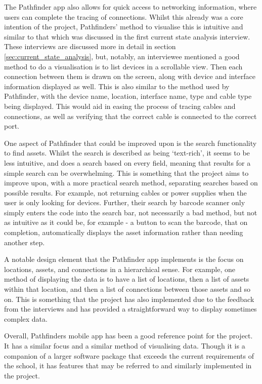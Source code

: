 \documentclass [11pt,a4paper]{article}
\begin{document}
The Pathfinder app also allows for quick access to networking information, where users can complete the tracing of connections. Whilst this already was a core intention of the project, Pathfinders' method to visualise this is intuitive and similar to that which was discussed in the first current state analysis interview. These interviews are discussed more in detail in section \ref{sec:current_state_analysis}, but, notably, an interviewee mentioned a good method to do a visualisation is to list devices in a scrollable view. Then each connection between them is drawn on the screen, along with device and interface information displayed as well. This is also similar to the method used by Pathfinder, with the device name, location, interface name, type and cable type being displayed. This would aid in easing the process of tracing cables and connections, as well as verifying that the correct cable is connected to the correct port.

One aspect of Pathfinder that could be improved upon is the search functionality to find assets. Whilst the search is described as being `text-rich', it seems to be less intuitive, and does a search based on every field, meaning that results for a simple search can be overwhelming. This is something that the project aims to improve upon, with a more practical search method, separating searches based on possible results. For example, not returning cables or power supplies when the user is only looking for devices. Further, their search by barcode scanner only simply enters the code into the search bar, not necessarily a bad method, but not as intuitive as it could be, for example - a button to scan the barcode, that on completion, automatically displays the asset information rather than needing another step.

A notable design element that the Pathfinder app implements is the focus on locations, assets, and connections in a hierarchical sense. For example, one method of displaying the data is to have a list of locations, then a list of assets within that location, and then a list of connections between those assets and so on. This is something that the project has also implemented due to the feedback from the interviews and has provided a straightforward way to display sometimes complex data.

Overall, Pathfinders mobile app has been a good reference point for the project. It has a similar focus and a similar method of visualising data. Though it is a companion of a larger software package that exceeds the current requirements of the school, it has features that may be referred to and similarly implemented in the project.  
\end{document}
